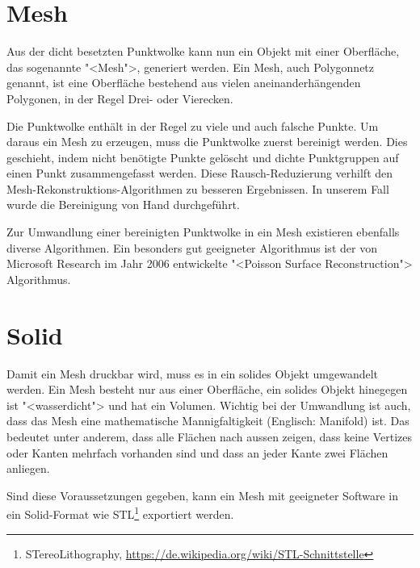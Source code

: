 \section{Mesh}

\label{photogrammetry:mesh}

Aus der dicht besetzten Punktwolke kann nun ein Objekt mit einer Oberfläche, das
sogenannte "<Mesh">, generiert werden. Ein Mesh, auch Polygonnetz genannt, ist
eine Oberfläche bestehend aus vielen aneinanderhängenden Polygonen, in der Regel
Drei- oder Vierecken.

Die Punktwolke enthält in der Regel zu viele und auch falsche Punkte. Um daraus
ein Mesh zu erzeugen, muss die Punktwolke zuerst bereinigt werden. Dies
geschieht, indem nicht benötigte Punkte gelöscht und dichte Punktgruppen auf
einen Punkt zusammengefasst werden. Diese Rausch-Reduzierung verhilft den
Mesh-Rekon\-struk\-tions-Algorithmen zu besseren Ergebnissen. In unserem Fall wurde
die Bereinigung von Hand durchgeführt.

Zur Umwandlung einer bereinigten Punktwolke in ein Mesh existieren ebenfalls
diverse Algorithmen. Ein besonders gut geeigneter Algorithmus ist der von
Microsoft Research im Jahr 2006 entwickelte "<Poisson Surface
Reconstruction">\cite{kazhdan:2006} Algorithmus.


\section{Solid}

Damit ein Mesh druckbar wird, muss es in ein solides Objekt umgewandelt werden.
Ein Mesh besteht nur aus einer Oberfläche, ein solides Objekt hinegegen ist
"<wasserdicht"> und hat ein Volumen. Wichtig bei der Umwandlung ist auch, dass
das Mesh eine mathematische Mannigfaltigkeit (Englisch: Manifold) ist. Das
bedeutet unter anderem, dass alle Flächen nach aussen zeigen, dass keine
Vertizes oder Kanten mehrfach vorhanden sind und dass an jeder Kante zwei
Flächen anliegen.

Sind diese Voraussetzungen gegeben, kann ein Mesh mit geeigneter Software in
ein Solid-Format wie STL\footnote{STereoLithography,
	\url{https://de.wikipedia.org/wiki/STL-Schnittstelle}} exportiert werden.


